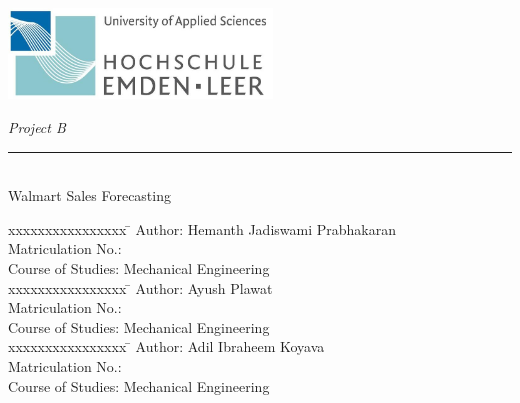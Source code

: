 %
%
%



\begin{titlepage}
    
    \begin{flushleft} 
        \includegraphics[width=7cm]{General/HSEmdenLeerLogo.png}
    \end{flushleft} 
    
    \begin{flushright}
        \vspace{3cm}
        \LARGE \textsl{Project B}\\
        \rule{0.6\textwidth}{0.4pt} ~\\
        \vspace{0.5cm}
        \textsf{\LARGE Walmart Sales Forecasting}\\
        \textsf{\LARGE }
    \end{flushright}
    
    \vspace{1cm}
    \large
    \begin{tabbing}
        xxxxxxxxxxxxxxxx \= \kill
        Author: \> Hemanth Jadiswami Prabhakaran \\
        Matriculation No.:  \\
        Course of Studies: \> Mechanical Engineering \\ [0.5cm]

        xxxxxxxxxxxxxxxx \= \kill
		Author: \> Ayush Plawat \\	
		Matriculation No.:  \\
		Course of Studies: \> Mechanical Engineering \\ [0.5cm]
		
		xxxxxxxxxxxxxxxx \= \kill
		Author: \> Adil Ibraheem Koyava \\	
		Matriculation No.:  \\
		Course of Studies: \> Mechanical Engineering \\ [0.5cm]


\end{tabbing}
\end{titlepage}
